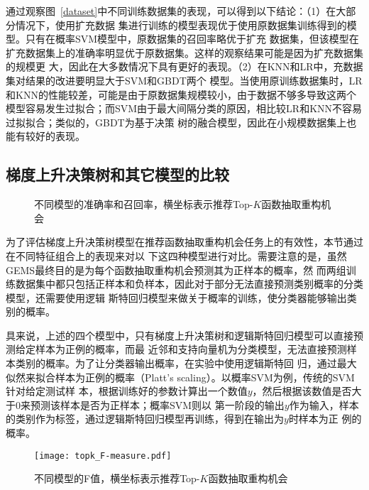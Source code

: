 通过观察图~\ref{dataset}中不同训练数据集的表现，可以得到以下结论：（1）在大部分情况下，使用扩充数据
集进行训练的模型表现优于使用原数据集训练得到的模型。只有在概率SVM模型中，原数据集的召回率略优于扩充
数据集，但该模型在扩充数据集上的准确率明显优于原数据集。这样的观察结果可能是因为扩充数据集的规模更
大，因此在大多数情况下具有更好的表现。（2）在KNN和LR中，充数据集对结果的改进要明显大于SVM和GBDT两个
模型。当使用原训练数据集时，LR和KNN的性能较差，可能是由于原数据集规模较小，由于数据不够多导致这两个
模型容易发生过拟合；而SVM由于最大间隔分类的原因，相比较LR和KNN不容易过拟拟合；类似的，GBDT为基于决策
树的融合模型，因此在小规模数据集上也能有较好的表现。

\subsection{梯度上升决策树和其它模型的比较}\label{RQ3}

\begin{figure}
\centering
{}
\hfill
{}
\caption{不同模型的准确率和召回率，横坐标表示推荐Top-$K$函数抽取重构机会}
\label{models1}
\end{figure}

为了评估梯度上升决策树模型在推荐函数抽取重构机会任务上的有效性，本节通过在不同特征组合上的表现来对以
下这四种模型进行对比。需要注意的是，虽然GEMS最终目的是为每个函数抽取重构机会预测其为正样本的概率，然
而两组训练数据集中都只包括正样本和负样本，因此对于部分无法直接预测类别概率的分类模型，还需要使用逻辑
斯特回归模型来做关于概率的训练，使分类器能够输出类别的概率。

具来说，上述的四个模型中，只有梯度上升决策树和逻辑斯特回归模型可以直接预测给定样本为正例的概率，而最
近邻和支持向量机为分类模型，无法直接预测样本类别的概率。为了让分类器输出概率，在实验中使用逻辑斯特回
归，通过最大似然来拟合样本为正例的概率（Platt's scaling）。以概率SVM为例，传统的SVM针对给定测试样
本，根据训练好的参数计算出一个数值$y$，然后根据该数值是否大于0来预测该样本是否为正样本；概率SVM则以
第一阶段的输出$y$作为输入，样本的类别作为标签，通过逻辑斯特回归模型再训练，得到在输出为$y$时样本为正
例的概率。

\begin{figure}
\centering
\texttt{[image: topk\_F-measure.pdf]}
\caption{不同模型的F值，横坐标表示推荐Top-$K$函数抽取重构机会}
\label{models2}
\end{figure}

